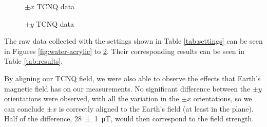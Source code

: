 \documentclass[a4paper]{scrartcl}
\begin{document}
\begin{figure}
    \centering
    \caption{\(\pm x\) TCNQ data}
    \label{fig:tcnq-aligned}
\end{figure}
\begin{figure}
    \centering
    \caption{\(\pm y\) TCNQ data}
    \label{fig:tcnq-orthognal}
\end{figure}

The raw data collected with the settings shown in Table \ref{tab:settings} can be seen in Figures \ref{fig:water-acrylic} to \ref{fig:tcnq-orthognal}. Their corresponding results can be seen in Table \ref{tab:results}.

By aligning our TCNQ field, we were also able to observe the effects that Earth's magnetic field has on our measurements. No significant difference between the \(\pm y\) orientations were observed, with all the variation in the \(\pm x\) orientations, so we can conclude \(\pm x\) is correctly aligned to the Earth's field (at least in the plane). Half of the difference, \SI{28 \pm 1}{\micro\tesla}, would then correspond to the field strength.
\end{document}

